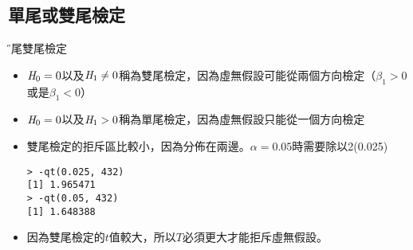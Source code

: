\documentclass[xcolor=dvipsnames]{beamer}
\begin{document}
\subsection{單尾或雙尾檢定}
\begin{frame}[fragile=singleslide]{\H 單尾雙尾檢定}
\begin{itemize}
\item $\emph{H}_{0}=0$以及$\emph{H}_{1}\neq 0$稱為雙尾檢定，因為虛無假設可能從兩個方向檢定（$\beta_{1}>0$或是$\beta_{1}<0$）
\item $\emph{H}_{0}=0$以及$\emph{H}_{1}> 0$稱為單尾檢定，因為虛無假設只能從一個方向檢定
\item 雙尾檢定的拒斥區比較小，因為分佈在兩邊。$\alpha=0.05$時需要除以2(0.025)
\begin{Verbatim}[frame=single,label=R code,
fontseries=b,xleftmargin=2mm,commandchars=\\\{\},
formatcom=\color{blue}]
> -qt(0.025, 432)
[1] 1.965471
> -qt(0.05, 432)
[1] 1.648388
\end{Verbatim}
\item 因為雙尾檢定的$t$值較大，所以$T$必須更大才能拒斥虛無假設。
\end{itemize}
\end{frame}
\end{document}
